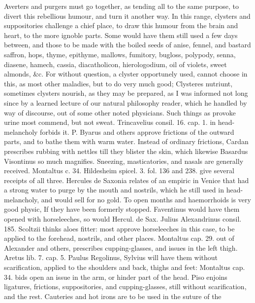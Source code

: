 Averters and purgers must go together, as tending all to the same
purpose, to divert this rebellious humour, and turn it another way. In
this range, clysters and suppositories challenge a chief place, to draw
this humour from the brain and heart, to the more ignoble parts. Some
would have them still used a few days between, and those to be made
with the boiled seeds of anise, fennel, and bastard saffron, hops,
thyme, epithyme, mallows, fumitory, bugloss, polypody, senna, diasene,
hamech, cassia, diacatholicon, hierologodium, oil of violets, sweet
almonds, \&c. For without question, a clyster opportunely used, cannot
choose in this, as most other maladies, but to do very much good;
Clysteres nutriunt, sometimes clysters nourish, as they may be
prepared, as I was informed not long since by a learned lecture of our
natural philosophy reader, which he handled by way of discourse,
out of some other noted physicians. Such things as provoke urine most
commend, but not sweat. Trincavelius consil. 16. cap. 1. in
head-melancholy forbids it. P. Byarus and others approve frictions of
the outward parts, and to bathe them with warm water. Instead of
ordinary frictions, Cardan prescribes rubbing with nettles till they
blister the skin, which likewise Basardus Visontinus so much
magnifies.
Sneezing, masticatories, and nasals are generally received. Montaltus
c. 34. Hildesheim spicel. 3. fol. 136 and 238. give several receipts of
all three. Hercules de Saxonia relates of an empiric in Venice
that had a strong water to purge by the mouth and nostrils, which
he still used in head-melancholy, and would sell for no gold.
To open months and haemorrhoids is very good physic, If they have
been formerly stopped. Faventinus would have them opened with
horseleeches, so would Hercul. de Sax. Julius Alexandrinus consil. 185.
Scoltzii thinks aloes fitter: most approve horseleeches in this
case, to be applied to the forehead, nostrils, and other places.
Montaltus cap. 29. out of Alexander and others, prescribes 
cupping-glasses, and issues in the left thigh. Aretus lib. 7. cap. 5.
Paulus Regolinus, Sylvius will have them without scarification,
applied to the shoulders and back, thighs and feet: Montaltus
cap. 34. bids open an issue in the arm, or hinder part of the head.
Piso enjoins ligatures, frictions, suppositories, and
cupping-glasses, still without scarification, and the rest.
Cauteries and hot irons are to be used in the suture of the
